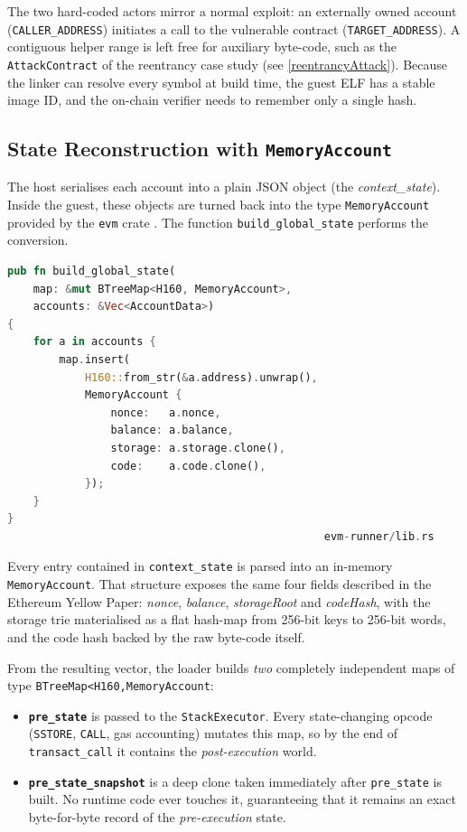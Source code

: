 The two hard-coded actors mirror a normal exploit: an externally owned account
(\texttt{CALLER\_ADDRESS}) initiates a call to the vulnerable contract
(\texttt{TARGET\allowbreak\_ADDRESS}).  A contiguous helper range is left free for
auxiliary byte-code, such as the \texttt{AttackContract} of the reentrancy
case study (see \ref{reentrancyAttack}). Because the linker can resolve every symbol at build time, the guest ELF has a stable image ID, and the on-chain verifier needs to remember only a single hash.

\subsection{State Reconstruction with \texttt{MemoryAccount}}

The host serialises each account into a plain JSON object (the \textit{context\_state}). Inside the guest, these objects are turned back into the type \texttt{MemoryAccount} provided by the \texttt{evm} crate \cite{memoryaccountdocs}. The function \texttt{build\_global\_state} performs the conversion.

\begin{lstlisting}[caption={[Loading JSON into the backend]},language=Rust]
pub fn build_global_state(
    map: &mut BTreeMap<H160, MemoryAccount>,
    accounts: &Vec<AccountData>)
{
    for a in accounts {
        map.insert(
            H160::from_str(&a.address).unwrap(),
            MemoryAccount {
                nonce:   a.nonce,
                balance: a.balance,
                storage: a.storage.clone(),
                code:    a.code.clone(),
            });
    }
}
                                                 evm-runner/lib.rs
\end{lstlisting}

Every entry contained in \texttt{context\_state} is parsed into an in-memory
\texttt{MemoryAccount}\cite{memoryaccountdocs}.  That structure exposes the same four fields described in the Ethereum Yellow Paper: \textit{nonce},
\textit{balance}, \textit{storageRoot} and \textit{codeHash}, with the storage trie
materialised as a flat hash-map from 256-bit keys to 256-bit words, and the
code hash backed by the raw byte-code itself.

From the resulting vector, the loader builds \textit{two} completely independent maps of type \texttt{BTreeMap<H160,\;MemoryAccount\>}:

\begin{itemize}
  \item \textbf{\texttt{pre\_state}} is passed to the
        \texttt{StackExecutor}.  Every state-changing opcode
        (\texttt{SSTORE}, \texttt{CALL}, gas accounting) mutates this map, so
        by the end of \texttt{transact\_call} it contains the
        \textit{post-execution} world.
  \item \textbf{\texttt{pre\_state\_snapshot}} is a deep clone taken
        immediately after \texttt{pre\_state} is built.  No runtime code ever
        touches it, guaranteeing that it remains an exact byte-for-byte record
        of the \textit{pre-execution} state.
\end{itemize}

